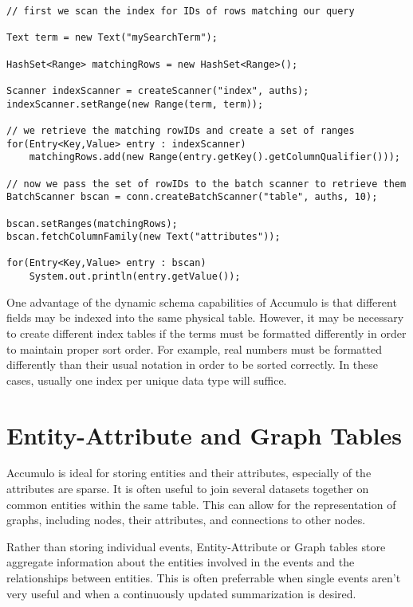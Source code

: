 \small
\begin{verbatim}
// first we scan the index for IDs of rows matching our query

Text term = new Text("mySearchTerm");

HashSet<Range> matchingRows = new HashSet<Range>();

Scanner indexScanner = createScanner("index", auths);
indexScanner.setRange(new Range(term, term));

// we retrieve the matching rowIDs and create a set of ranges
for(Entry<Key,Value> entry : indexScanner)
    matchingRows.add(new Range(entry.getKey().getColumnQualifier()));

// now we pass the set of rowIDs to the batch scanner to retrieve them
BatchScanner bscan = conn.createBatchScanner("table", auths, 10);

bscan.setRanges(matchingRows);
bscan.fetchColumnFamily(new Text("attributes"));

for(Entry<Key,Value> entry : bscan)
    System.out.println(entry.getValue());
\end{verbatim}
\normalsize

One advantage of the dynamic schema capabilities of Accumulo is that different
fields may be indexed into the same physical table. However, it may be necessary to
create different index tables if the terms must be formatted differently in order to
maintain proper sort order. For example, real numbers must be formatted
differently than their usual notation in order to be sorted correctly. In these cases,
usually one index per unique data type will suffice.

\section{Entity-Attribute and Graph Tables}

Accumulo is ideal for storing entities and their attributes, especially of the
attributes are sparse. It is often useful to join several datasets together on common
entities within the same table. This can allow for the representation of graphs,
including nodes, their attributes, and connections to other nodes.

Rather than storing individual events, Entity-Attribute or Graph tables store
aggregate information about the entities involved in the events and the
relationships between entities. This is often preferrable when single events aren't
very useful and when a continuously updated summarization is desired.

